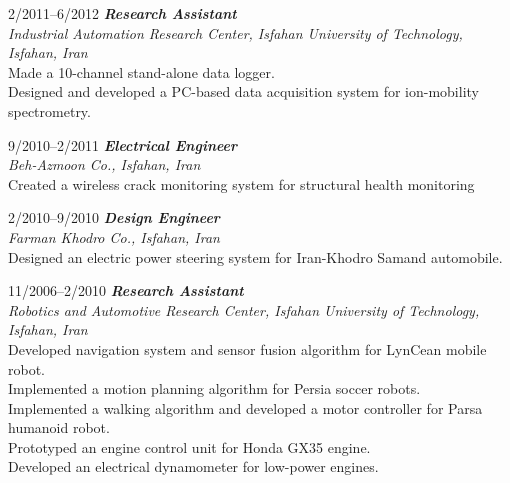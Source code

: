 \documentclass[10pt]{article}
\newlength{\Vspace}
\newlength{\Vspace}
\begin{document}
\begin{CV}
\item[2/2011--6/2012] \textbf{\textit{Research Assistant}} \\
    \textit{Industrial Automation Research Center, Isfahan University of Technology, Isfahan, Iran}\vspace{\Vspace} \\
    Made a 10-channel stand-alone data logger. \\
    Designed and developed a PC-based data acquisition system for ion-mobility spectrometry.

\item[9/2010--2/2011] \textbf{\textit{Electrical Engineer}} \\
    \textit{Beh-Azmoon Co., Isfahan, Iran}\vspace{\Vspace} \\
    Created a wireless crack monitoring system for structural health monitoring %

\item[2/2010--9/2010] \textbf{\textit{Design Engineer}} \\
    \textit{Farman Khodro Co., Isfahan, Iran}\vspace{\Vspace} \\
    Designed an electric power steering system for Iran-Khodro Samand automobile.

\item[11/2006--2/2010] \textbf{\textit{Research Assistant}} \\
    \textit{Robotics and Automotive Research Center, Isfahan University of Technology, Isfahan, Iran}\vspace{\Vspace} \\
    Developed navigation system and sensor fusion algorithm for LynCean mobile robot. \\
    Implemented a motion planning algorithm for Persia soccer robots. \\
    Implemented a walking algorithm and developed a motor controller for Parsa humanoid robot. \\
    Prototyped an engine control unit for Honda GX35 engine. \\
    Developed an electrical dynamometer for low-power engines.



\end{CV}
\end{document}
